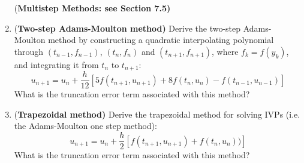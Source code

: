 \documentclass [12pt]{article}
\begin{document}
\begin{enumerate}
%
%
%
%
%
%
%
%
%
%
%
%
%
%

{(\bf Multistep Methods: see Section 7.5)}




\item {(\bf Two-step Adams-Moulton method)} Derive the two-step Adams-Moulton method by constructing a quadratic interpolating polynomial through $(t_{n-1},f_{n-1})$, $(t_{n},f_{n})$ and $(t_{n+1},f_{n+1})$, where $f_k=f(y_k)$, and integrating it from $t_n$ to $t_{n+1}$:
%
\[
u_{n+1}=u_n+\frac{h}{12}\left[5f(t_{n+1},u_{n+1})+8f(t_{n},u_{n})-f(t_{n-1},u_{n-1})\right]
\]
%
What is the truncation error term associated with this method?


\item {(\bf Trapezoidal method)} Derive the trapezoidal method for solving IVPs (i.e. the Adams-Moulton one step method):
%
\[
u_{n+1}=u_n+\frac{h}{2}\left[f(t_{n+1},u_{n+1})+f(t_{n},u_{n}))\right]
\]
%
What is the truncation error term associated with this method?


\end{enumerate}
\end{document}
